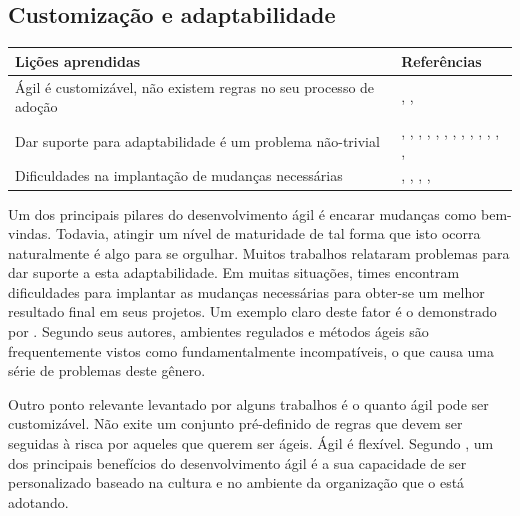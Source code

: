 \subsection{Customização e adaptabilidade}

\begin{table}[H]
	\centering
	\begin{tabularx}{\linewidth}{ | X | p{5cm} | } \hline \textbf{Lições aprendidas} & \textbf{Referências} \\ \hline
		Ágil é customizável, não existem regras no seu processo de adoção & \cite{Hajjdiab2011}, \cite{Piegas2012}, \cite{Hui2013} \\ \hline
		Dar suporte para adaptabilidade é um problema não-trivial & \cite{Block2011}, \cite{Asnawi2012}, \cite{Fitzgerald2013}, \cite{Bustard2013}, \cite{Microsoft2013}, \cite{Lapham2012}, \cite{Claudia2013}, \cite{Nokia2013}, \cite{Rodrigues2013}, \cite{Bastos2013}, \cite{Maciel2013}, \cite{Hui2013}, \cite{Ahmed2008}, \cite{Sahota2012} \\ \hline
		Dificuldades na implantação de mudanças necessárias & \cite{Vieira2013}, \cite{Bastos2013}, \cite{Maciel2013}, \cite{Hui2013}, \cite{Sahota2012} \\ \hline
	\end{tabularx}
\end{table}

Um dos principais pilares do desenvolvimento ágil é encarar mudanças como bem-vindas. Todavia, atingir um nível de maturidade de tal forma que isto ocorra naturalmente é algo para se orgulhar. Muitos trabalhos relataram problemas para dar suporte a esta adaptabilidade. Em muitas situações, times encontram dificuldades para implantar as mudanças necessárias para obter-se um melhor resultado final em seus projetos. Um exemplo claro deste fator é o demonstrado por \cite{Fitzgerald2013}. Segundo seus autores, ambientes regulados e métodos ágeis são frequentemente vistos como fundamentalmente incompatíveis, o que causa uma série de problemas deste gênero.

Outro ponto relevante levantado por alguns trabalhos é o quanto ágil pode ser customizável. Não exite um conjunto pré-definido de regras que devem ser seguidas à risca por aqueles que querem ser ágeis. Ágil é flexível. Segundo \cite{Hajjdiab2011}, um dos principais benefícios do desenvolvimento ágil é a sua capacidade de ser personalizado baseado na cultura e no ambiente da organização que o está adotando.

